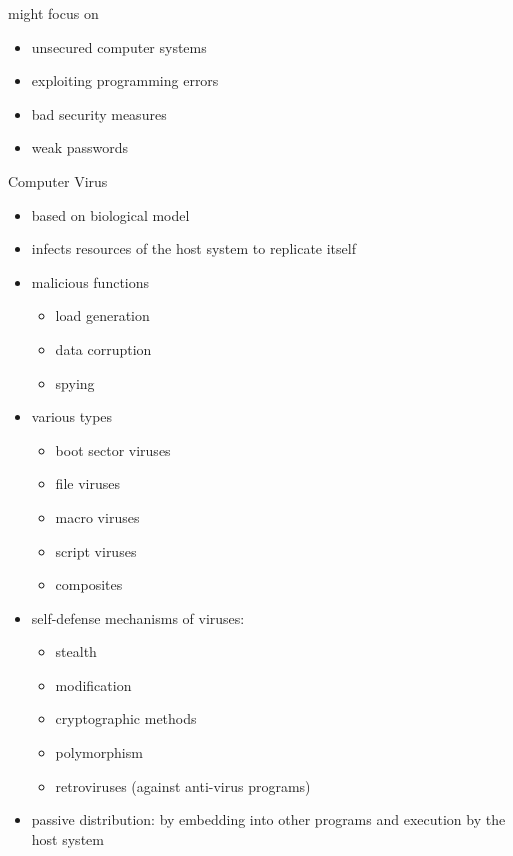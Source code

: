 \documentclass[11pt]{article}
\begin{document}
might focus on
\begin{itemize}
\item unsecured computer systems
\item exploiting programming errors
\item bad security measures
\item weak passwords
\end{itemize}


Computer Virus
\begin{itemize}
\item based on biological model
\item infects resources of the host system to replicate itself
\item malicious functions
\begin{itemize}
\item load generation
\item data corruption
\item spying
\end{itemize}
\item various types
\begin{itemize}
\item boot sector viruses
\item file viruses
\item macro viruses
\item script viruses
\item composites
\end{itemize}
\item self-defense mechanisms of viruses:
\begin{itemize}
\item stealth
\item modification
\item cryptographic methods
\item polymorphism
\item retroviruses (against anti-virus programs)
\end{itemize}
\item passive distribution: by embedding into other programs and execution by the host system
\end{itemize}
\end{document}
